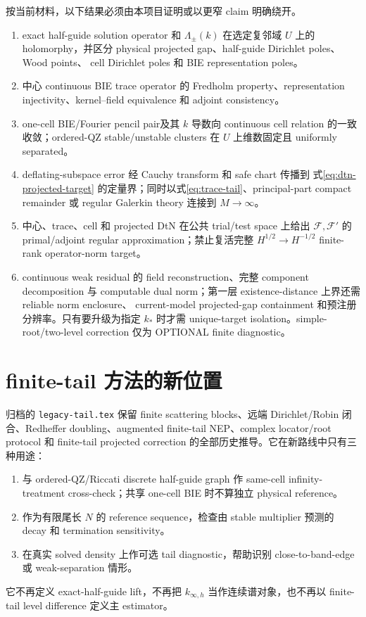 \documentclass[UTF8,fontset=fandol,11pt,a4paper]{ctexart}
\newcommand{\cF}{\mathcal F}
\begin{document}
按当前材料，以下结果必须由本项目证明或以更窄 claim 明确绕开。
\begin{enumerate}
  \item exact half-guide solution operator 和 $\Lambda_\pm(k)$ 在选定复邻域 $U$ 上的
  holomorphy，并区分 physical projected gap、half-guide Dirichlet poles、Wood points、
  cell Dirichlet poles 和 BIE representation poles。
  \item 中心 continuous BIE trace operator 的 Fredholm property、representation
  injectivity、kernel--field equivalence 和 adjoint consistency。
  \item one-cell BIE/Fourier pencil pair及其 $k$ 导数向 continuous cell relation 的一致
  收敛；ordered-QZ stable/unstable clusters 在 $U$ 上维数固定且 uniformly separated。
  \item deflating-subspace error 经 Cauchy transform 和 safe chart 传播到
  式\eqref{eq:dtn-projected-target} 的定量界；同时以式\eqref{eq:trace-tail}、principal-part
  compact remainder 或 regular Galerkin theory 连接到 $M\to\infty$。
  \item 中心、trace、cell 和 projected DtN 在公共 trial/test space 上给出
  $\cF,\cF'$ 的 primal/adjoint regular approximation；禁止复活完整
  $H^{1/2}\to H^{-1/2}$ finite-rank operator-norm target。
  \item continuous weak residual 的 field reconstruction、完整 component decomposition 与
  computable dual norm；第一层 existence-distance 上界还需 reliable norm enclosure、
  current-model projected-gap containment 和预注册分辨率。只有要升级为指定 $k_*$ 时才需
  unique-target isolation。simple-root/two-level correction 仅为 OPTIONAL finite diagnostic。
\end{enumerate}

\section{finite-tail 方法的新位置}

归档的 \texttt{legacy-tail.tex} 保留 finite scattering blocks、远端 Dirichlet/Robin
闭合、Redheffer doubling、augmented finite-tail NEP、complex locator/root protocol 和
finite-tail projected correction 的全部历史推导。它在新路线中只有三种用途：
\begin{enumerate}
  \item 与 ordered-QZ/Riccati discrete half-guide graph 作 same-cell infinity-treatment
  cross-check；共享 one-cell BIE 时不算独立 physical reference。
  \item 作为有限尾长 $N$ 的 reference sequence，检查由 stable multiplier 预测的 decay
  和 termination sensitivity。
  \item 在真实 solved density 上作可选 tail diagnostic，帮助识别 close-to-band-edge
  或 weak-separation 情形。
\end{enumerate}
它不再定义 exact-half-guide lift，不再把 $k_{\infty,h}$ 当作连续谱对象，也不再以
finite-tail level difference 定义主 estimator。
\end{document}
